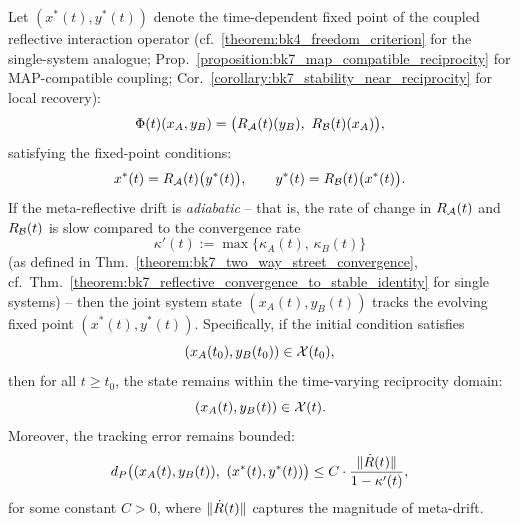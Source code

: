 \begin{corollary}
\label{corollary:bk7_fixed_point_tracking_within_evolving_reciprocity}
Let \( (x^*(t), y^*(t)) \) denote the time-dependent fixed point of the coupled reflective interaction operator (cf.~\ref{theorem:bk4_freedom_criterion} for the single-system analogue; Prop.~\ref{proposition:bk7_map_compatible_reciprocity} for MAP-compatible coupling; Cor.~\ref{corollary:bk7_stability_near_reciprocity} for local recovery):
\[
\Phi(t)(x_A, y_B) = \big( R_{\mathcal{A}}(t)(y_B),\ R_{\mathcal{B}}(t)(x_A) \big),
\]
satisfying the fixed-point conditions:
\[
x^*(t) = R_{\mathcal{A}}(t)\big(y^*(t)\big), 
\qquad 
y^*(t) = R_{\mathcal{B}}(t)\big(x^*(t)\big).
\]
If the meta-reflective drift is \emph{adiabatic} -- that is, the rate of change in 
\( R_{\mathcal{A}}(t) \) and \( R_{\mathcal{B}}(t) \) is slow compared to the 
convergence rate 
\[
\kappa'(t) := \max\{ \kappa_A(t),\, \kappa_B(t) \}
\]
(as defined in Thm.~\ref{theorem:bk7_two_way_street_convergence}, cf.~Thm.~\ref{theorem:bk7_reflective_convergence_to_stable_identity} 
for single systems) -- then the joint system state \( (x_A(t), y_B(t)) \) tracks 
the evolving fixed point \( (x^*(t), y^*(t)) \).
Specifically, if the initial condition satisfies
\[
(x_A(t_0), y_B(t_0)) \in \mathcal{X}(t_0),
\]
then for all \( t \geq t_0 \), the state remains within the time-varying reciprocity domain:
\[
(x_A(t), y_B(t)) \in \mathcal{X}(t).
\]
Moreover, the tracking error remains bounded:
\[
d_P\big( (x_A(t), y_B(t)),\ (x^*(t), y^*(t)) \big)
\le C \cdot \frac{\|\dot{R}(t)\|}{1 - \kappa'(t)},
\]
for some constant \( C > 0 \), where \( \|\dot{R}(t)\| \) captures the magnitude of meta-drift.
\end{corollary}
